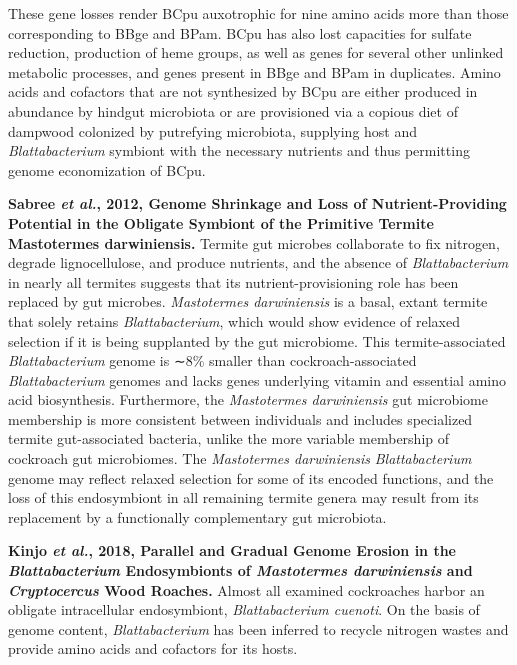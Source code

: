 \documentclass[11pt]{article}
\begin{document}
\begin{sloppypar}
These gene losses render BCpu auxotrophic for nine amino acids more than those corresponding to BBge and BPam. 
BCpu has also lost capacities for sulfate reduction, production of heme groups, as well as genes for several other unlinked metabolic processes, and genes present in BBge and BPam in duplicates. 
Amino acids and cofactors that are not synthesized by BCpu are either produced in abundance by hindgut microbiota or are provisioned via a copious diet of dampwood colonized by putrefying microbiota, supplying host and \textit{Blattabacterium} symbiont with the necessary nutrients and thus permitting genome economization of BCpu.
\par
\textbf{Sabree \textit{et al.}, 2012, Genome Shrinkage and Loss of Nutrient-Providing Potential in the Obligate Symbiont of the Primitive Termite Mastotermes darwiniensis.} \newline
Termite gut microbes collaborate to fix nitrogen, degrade lignocellulose, and produce nutrients, and the absence of \textit{Blattabacterium} in nearly all termites suggests that its nutrient-provisioning role has been replaced by gut microbes. 
\textit{Mastotermes darwiniensis} is a basal, extant termite that solely retains \textit{Blattabacterium}, which would show evidence of relaxed selection if it is being supplanted by the gut microbiome. 
This termite-associated \textit{Blattabacterium} genome is ∼8\% smaller than cockroach-associated \textit{Blattabacterium} genomes and lacks genes underlying vitamin and essential amino acid biosynthesis. 
Furthermore, the \textit{Mastotermes darwiniensis} gut microbiome membership is more consistent between individuals and includes specialized termite gut-associated bacteria, unlike the more variable membership of cockroach gut microbiomes. 
The \textit{Mastotermes darwiniensis} \textit{Blattabacterium} genome may reflect relaxed selection for some of its encoded functions, and the loss of this endosymbiont in all remaining termite genera may result from its replacement by a functionally complementary gut microbiota.
\par
\textbf{Kinjo \textit{et al.}, 2018, Parallel and Gradual Genome Erosion in the \textit{Blattabacterium} Endosymbionts of \textit{Mastotermes darwiniensis} and \textit{Cryptocercus} Wood Roaches.} \newline
Almost all examined cockroaches harbor an obligate intracellular endosymbiont, \textit{Blattabacterium cuenoti}. 
On the basis of genome content, \textit{Blattabacterium} has been inferred to recycle nitrogen wastes and provide amino acids and cofactors for its hosts. 

\end{sloppypar}
\end{document}
